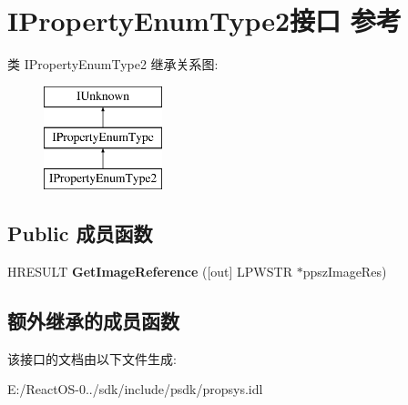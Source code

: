 \hypertarget{interface_i_property_enum_type2}{}\section{I\+Property\+Enum\+Type2接口 参考}
\label{interface_i_property_enum_type2}
类 I\+Property\+Enum\+Type2 继承关系图\+:\begin{figure}[H]
\begin{center}
\leavevmode
\includegraphics[height=3.000000cm]{interface_i_property_enum_type2}
\end{center}
\end{figure}
\subsection*{Public 成员函数}
\begin{DoxyCompactItemize}
\item 
\mbox{\label{interface_i_property_enum_type2_afab2204b97384d69bab220fdc925060b}} 
H\+R\+E\+S\+U\+LT {\bfseries Get\+Image\+Reference} (\mbox{[}out\mbox{]} L\+P\+W\+S\+TR $\ast$ppsz\+Image\+Res)
\end{DoxyCompactItemize}
\subsection*{额外继承的成员函数}


该接口的文档由以下文件生成\+:\begin{DoxyCompactItemize}
\item 
E\+:/\+React\+O\+S-\/0../sdk/include/psdk/propsys.\+idl\end{DoxyCompactItemize}
